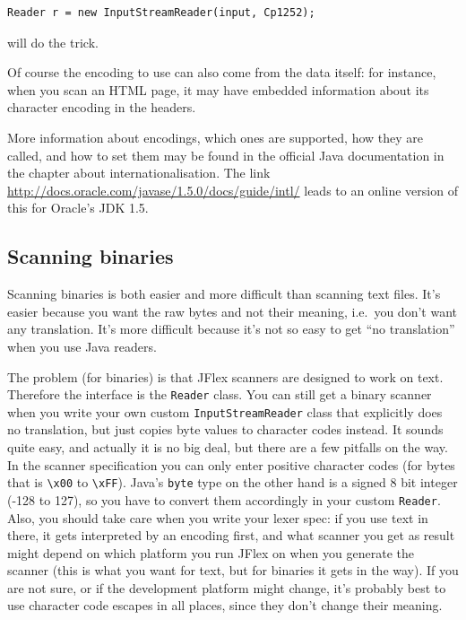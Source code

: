 \begin{verbatim}
Reader r = new InputStreamReader(input, Cp1252);
\end{verbatim}

will do the trick.

Of course the encoding to use can also come from the data itself: for
instance, when you scan an HTML page, it may have embedded information
about its character encoding in the headers.

More information about encodings, which ones are supported, how they are
called, and how to set them may be found in the official Java
documentation in the chapter about internationalisation. The link
\url{http://docs.oracle.com/javase/1.5.0/docs/guide/intl/} leads to an
online version of this for Oracle's JDK 1.5.

\subsection{Scanning binaries}\label{scanning-binaries}

Scanning binaries is both easier and more difficult than scanning text
files. It's easier because you want the raw bytes and not their meaning,
i.e.~you don't want any translation. It's more difficult because it's
not so easy to get ``no translation'' when you use Java readers.

The problem (for binaries) is that JFlex scanners are designed to work
on text. Therefore the interface is the \texttt{Reader} class. You can
still get a binary scanner when you write your own custom
\texttt{InputStreamReader} class that explicitly does no translation,
but just copies byte values to character codes instead. It sounds quite
easy, and actually it is no big deal, but there are a few pitfalls on
the way. In the scanner specification you can only enter positive
character codes (for bytes that is \texttt{\textbackslash{}x00} to
\texttt{\textbackslash{}xFF}). Java's \texttt{byte} type on the other
hand is a signed 8 bit integer (-128 to 127), so you have to convert
them accordingly in your custom \texttt{Reader}. Also, you should take
care when you write your lexer spec: if you use text in there, it gets
interpreted by an encoding first, and what scanner you get as result
might depend on which platform you run JFlex on when you generate the
scanner (this is what you want for text, but for binaries it gets in the
way). If you are not sure, or if the development platform might change,
it's probably best to use character code escapes in all places, since
they don't change their meaning.

